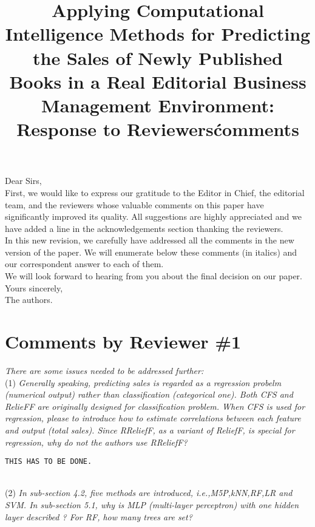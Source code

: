\documentclass[preprint]{elsarticle}
\begin{document}

\title{Applying Computational Intelligence Methods for Predicting the Sales of Newly Published Books in a Real Editorial Business Management Environment: Response to Reviewers\' comments}

\noindent
Dear Sirs,\\

First, we would like to express our gratitude to the Editor in Chief, the editorial team, and the reviewers whose valuable comments on this paper have significantly improved its quality. All suggestions are highly appreciated and we have added a line in the acknowledgements section thanking the reviewers. \\

In this new revision, we carefully have addressed all the comments in the new version of the paper. We will enumerate below these comments (in italics) and our correspondent answer to each of them. \\

We will look forward to hearing from you about the final decision on our paper. \\

\noindent
Yours sincerely,\\
The authors.


\section{Comments by Reviewer \#1}

\noindent \emph{There are some issues needed to be addressed further:} \\

\noindent (1) \emph{Generally speaking, predicting sales is regarded as a regression probelm (numerical output) rather than classification (categorical one). Both CFS and RelieFF are originally designed for classification problem. When CFS is used for regression, please to introduce how to estimate correlations between each feature and output (total sales). Since RReliefF, as a variant of ReliefF, is special for regression, why do not the authors use RReliefF? } 

\begin{verbatim}
THIS HAS TO BE DONE.
\end{verbatim}

~\\
\noindent (2) \emph{In sub-section 4.2, five methods are introduced, i.e.,M5P,kNN,RF,LR and SVM. In sub-section 5.1, why is MLP (multi-layer perceptron) with one hidden layer described ? For RF, how many trees are set? } 
\end{document}
